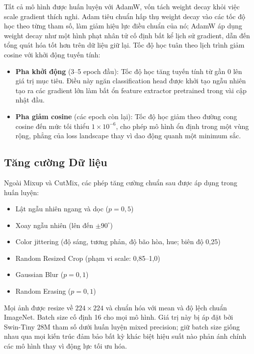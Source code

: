 Tất cả mô hình được huấn luyện với AdamW, vốn tách weight decay khỏi việc scale gradient thích nghi. Adam tiêu chuẩn hấp thụ weight decay vào các tốc độ học theo từng tham số, làm giảm hiệu lực điều chuẩn của nó; AdamW áp dụng weight decay như một hình phạt nhân tử cố định bất kể lịch sử gradient, dẫn đến tổng quát hóa tốt hơn trên dữ liệu giữ lại. Tốc độ học tuân theo lịch trình giảm cosine với khởi động tuyến tính:

\begin{itemize}
    \item \textbf{Pha khởi động} (3--5 epoch đầu): Tốc độ học tăng tuyến tính từ gần 0 lên giá trị mục tiêu. Điều này ngăn classification head được khởi tạo ngẫu nhiên tạo ra các gradient lớn làm bất ổn feature extractor pretrained trong vài cập nhật đầu.
    \item \textbf{Pha giảm cosine} (các epoch còn lại): Tốc độ học giảm theo đường cong cosine đến mức tối thiểu $1 \times 10^{-6}$, cho phép mô hình ổn định trong một vùng rộng, phẳng của loss landscape thay vì dao động quanh một minimum sắc.
\end{itemize}

\subsection{Tăng cường Dữ liệu}

Ngoài Mixup và CutMix, các phép tăng cường chuẩn sau được áp dụng trong huấn luyện:
\begin{itemize}
    \item Lật ngẫu nhiên ngang và dọc ($p = 0{,}5$)
    \item Xoay ngẫu nhiên (lên đến $\pm 90^\circ$)
    \item Color jittering (độ sáng, tương phản, độ bão hòa, hue; biên độ 0,25)
    \item Random Resized Crop (phạm vi scale: 0,85--1,0)
    \item Gaussian Blur ($p = 0{,}1$)
    \item Random Erasing ($p = 0{,}1$)
\end{itemize}

Mọi ảnh được resize về $224 \times 224$ và chuẩn hóa với mean và độ lệch chuẩn ImageNet. Batch size cố định 16 cho mọi mô hình. Giá trị này bị áp đặt bởi Swin-Tiny 28M tham số dưới huấn luyện mixed precision; giữ batch size giống nhau qua mọi kiến trúc đảm bảo bất kỳ khác biệt hiệu suất nào phản ánh chính các mô hình thay vì động lực tối ưu hóa.

